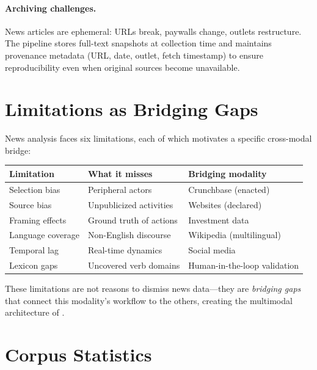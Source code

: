 \documentclass[../main.tex]{subfiles}
\begin{document}
\paragraph{Archiving challenges.}
News articles are ephemeral: URLs break, paywalls change,
outlets restructure.
The pipeline stores full-text snapshots at collection time
and maintains provenance metadata (URL, date, outlet, fetch
timestamp) to ensure reproducibility even when original
sources become unavailable.


\section{Limitations as Bridging Gaps}
\label{sec:news-limitations}

News analysis faces six limitations,
each of which motivates a specific cross-modal bridge:

\tableminimal
\begin{center}
\begin{tabular}{@{}p{3cm}p{4cm}p{4cm}@{}}
\toprule
\textbf{Limitation} & \textbf{What it misses} & \textbf{Bridging modality} \\
\midrule
Selection bias & Peripheral actors & Crunchbase (enacted) \\
Source bias & Unpublicized activities & Websites (declared) \\
Framing effects & Ground truth of actions & Investment data \\
Language coverage & Non-English discourse & Wikipedia (multilingual) \\
Temporal lag & Real-time dynamics & Social media \\
Lexicon gaps & Uncovered verb domains & Human-in-the-loop validation \\
\bottomrule
\end{tabular}
\label{tab:news-limitations}
\end{center}

These limitations are not reasons to dismiss news data---they are
\emph{bridging gaps} that connect this modality's workflow to the others,
creating the multimodal architecture of \RoleBox{}.


\section{Corpus Statistics}
\label{sec:news-corpus-stats}
\end{document}
